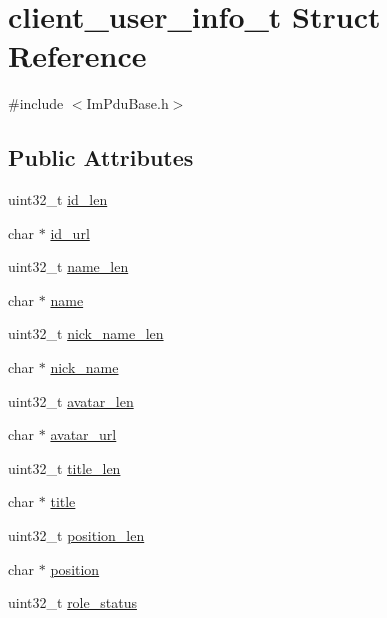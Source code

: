 \hypertarget{structclient__user__info__t}{}\section{client\+\_\+user\+\_\+info\+\_\+t Struct Reference}
\label{structclient__user__info__t}


{\ttfamily \#include $<$Im\+Pdu\+Base.\+h$>$}

\subsection*{Public Attributes}
\begin{DoxyCompactItemize}
\item 
uint32\+\_\+t \hyperlink{structclient__user__info__t_a9f4809061be48661b192a1a5d502d71f}{id\+\_\+len}
\item 
char $\ast$ \hyperlink{structclient__user__info__t_ac44177a23b8a24a145875bd6fdb87415}{id\+\_\+url}
\item 
uint32\+\_\+t \hyperlink{structclient__user__info__t_ab4c70f38fd3cb6d7f760fa01927ec92e}{name\+\_\+len}
\item 
char $\ast$ \hyperlink{structclient__user__info__t_aae4c04c621accdef079868fb8e42f8d2}{name}
\item 
uint32\+\_\+t \hyperlink{structclient__user__info__t_ae909c44ab253ac5e4cfb602628f9bec6}{nick\+\_\+name\+\_\+len}
\item 
char $\ast$ \hyperlink{structclient__user__info__t_a01720036a696000172a4a8726888843d}{nick\+\_\+name}
\item 
uint32\+\_\+t \hyperlink{structclient__user__info__t_a2a1ca30643dac3cfab9b70e2c64b8220}{avatar\+\_\+len}
\item 
char $\ast$ \hyperlink{structclient__user__info__t_ad47c2c165c3fb51f40f7444d2bf07ce4}{avatar\+\_\+url}
\item 
uint32\+\_\+t \hyperlink{structclient__user__info__t_a0930f07cfccca65d46f917f7b54cdcc2}{title\+\_\+len}
\item 
char $\ast$ \hyperlink{structclient__user__info__t_a7b5bd29e622c056fc36a7766adc375e2}{title}
\item 
uint32\+\_\+t \hyperlink{structclient__user__info__t_a9646cc117a03ca569e2e85ba3db15701}{position\+\_\+len}
\item 
char $\ast$ \hyperlink{structclient__user__info__t_a6d89c1a2f4a6ac960bc429980d71f2a2}{position}
\item 
uint32\+\_\+t \hyperlink{structclient__user__info__t_a7f4fbfce76bb6b27175fa40428554e2c}{role\+\_\+status}

\end{DoxyCompactItemize}
